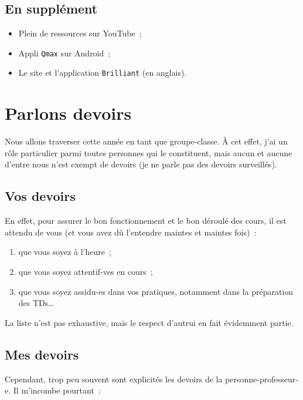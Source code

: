 \documentclass[10pt, garamond]{book}
\begin{document}
\subsection{En supplément}

\begin{itemize}
	\item Plein de ressources sur YouTube~;
	\item Appli \texttt{Qmax} sur Android~;
	\item Le site et l'application \texttt{Brilliant} (en anglais).
\end{itemize}

\section{Parlons devoirs}

Nous allons traverser cette année en tant que groupe-classe. À cet effet, j'ai
un rôle particulier parmi toutes personnes qui le constituent, mais aucun et
aucune d'entre nous n'est exempt de devoirs (je ne parle pas des devoirs
surveillés).

\subsection{Vos devoirs}

En effet, pour assurer le bon fonctionnement et le bon déroulé des cours, il est
attendu de vous (et vous avez dû l'entendre maintes et maintes fois)~:

\begin{enumerate}
	\item que vous soyez à l'heure~;
	\item que vous soyez attentif-ves en cours~;
	\item que vous soyez assidu-es dans vos pratiques, notamment dans la
	      préparation des TDs…
\end{enumerate}

La liste n'est pas exhaustive, mais le respect d'autrui en fait évidemment
partie.

\subsection{Mes devoirs}

Cependant, trop peu souvent sont explicités les devoirs de la
personne-professeur-e. Il m'incombe pourtant~:
\end{document}
